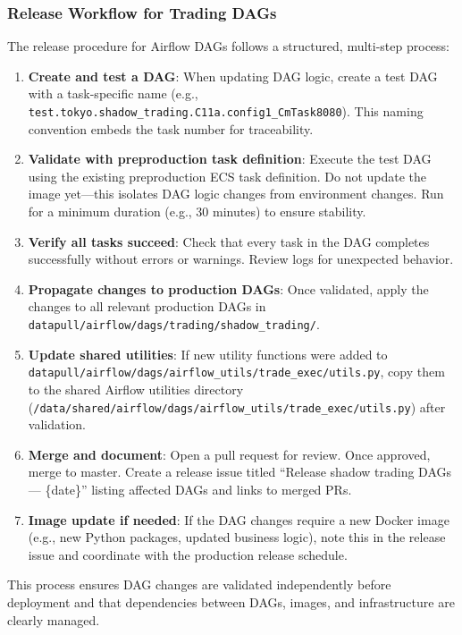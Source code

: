 \subsubsection{Release Workflow for Trading DAGs}
The release procedure for Airflow DAGs follows a structured, multi-step
process:
\begin{enumerate}
  \item \textbf{Create and test a DAG}: When updating DAG logic,
    create a test DAG with a task-specific name (e.g., \texttt{test.tokyo.shadow\_trading.C11a.config1\_CmTask8080}).
    This naming convention embeds the task number for traceability.

  \item \textbf{Validate with preproduction task definition}: Execute the
    test DAG using the existing preproduction ECS task definition. Do
    not update the image yet—this isolates DAG logic changes from
    environment changes. Run for a minimum duration (e.g., 30 minutes)
    to ensure stability.

  \item \textbf{Verify all tasks succeed}: Check that every task in the
    DAG completes successfully without errors or warnings. Review logs
    for unexpected behavior.

  \item \textbf{Propagate changes to production DAGs}: Once validated,
    apply the changes to all relevant production DAGs in \texttt{datapull/airflow/dags/trading/shadow\_trading/}.

  \item \textbf{Update shared utilities}: If new utility functions were
    added to \texttt{datapull/airflow/dags/airflow\_utils/trade\_exec/utils.py},
    copy them to the shared Airflow utilities directory (\texttt{/data/shared/airflow/dags/airflow\_utils/trade\_exec/utils.py})
    after validation.

  \item \textbf{Merge and document}: Open a pull request for review.
    Once approved, merge to master. Create a release issue titled ``Release
    shadow trading DAGs — \{date\}'' listing affected DAGs and links
    to merged PRs.

  \item \textbf{Image update if needed}: If the DAG changes require a new
    Docker image (e.g., new Python packages, updated business logic), note
    this in the release issue and coordinate with the production release
    schedule.
\end{enumerate}
This process ensures DAG changes are validated independently before
deployment and that dependencies between DAGs, images, and
infrastructure are clearly managed.

